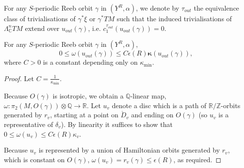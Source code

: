 \documentclass{article}
\numberwithin{equation}{section}
\numberwithin{figure}{section}
\begin{document}
\begin{defn}
For any $S$-periodic Reeb orbit $\gamma$ in $(Y^R,\alpha)$, we denote by $\tau_{out}$ the equivalence class of trivialisations of $\gamma^*\xi$ or $\gamma^*TM$ such that the induced trivialisations of $\Lambda^n_\mathbb{C}TM$ extend over $u_{out}(\gamma)$, i.e. $c_1^{\tau_{out}}(u_{out}(\gamma))=0$. 
\end{defn}

\begin{lem}
\label{outer_caps_action}
For any $S$-periodic Reeb orbit $\gamma$ in $(Y^R,\alpha)$,
\begin{equation}
    0\leq\omega(u_{out}(\gamma))\leq C\epsilon(R)\pmb{\kappa}(u_{out}(\gamma)),
\end{equation}
where $C>0$ is a constant depending only on $\kappa_{\min}$.
\end{lem}
\begin{proof}
Let $C=\frac{1}{\kappa_{\min}}$.

Because $O(\gamma)$ is isotropic, we obtain a $\mathbb{Q}$-linear map, $\omega:\pi_2(M,O(\gamma))\otimes\mathbb{Q}\rightarrow \mathbb{R}$. Let $u_v$ denote a disc which is a path of $\mathbb{R}/\mathbb{Z}$-orbits generated by $r_v$, starting at a point on $\mathring{D}_v$ and ending on $O(\gamma)$ (so $u_v$ is a representative of $\delta_v$). By linearity it suffices to show that $0\leq \omega(u_v)\leq C\epsilon(R)\kappa_v$.

Because $u_v$ is represented by a union of Hamiltonian orbits generated by $r_v$, which is constant on $O(\gamma)$, $\omega(u_v)=r_v(\gamma)\leq \epsilon(R)$, as required.
\end{proof}
\end{document}
